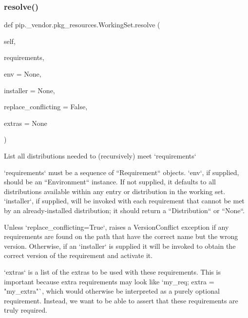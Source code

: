 \subsubsection{\texorpdfstring{resolve()}{resolve()}}
{\footnotesize\ttfamily def pip.\+\_\+vendor.\+pkg\+\_\+resources.\+Working\+Set.\+resolve (\begin{DoxyParamCaption}\item[{}]{self,  }\item[{}]{requirements,  }\item[{}]{env = {\ttfamily None},  }\item[{}]{installer = {\ttfamily None},  }\item[{}]{replace\+\_\+conflicting = {\ttfamily False},  }\item[{}]{extras = {\ttfamily None} }\end{DoxyParamCaption})}

\begin{DoxyVerb}List all distributions needed to (recursively) meet `requirements`

`requirements` must be a sequence of ``Requirement`` objects.  `env`,
if supplied, should be an ``Environment`` instance.  If
not supplied, it defaults to all distributions available within any
entry or distribution in the working set.  `installer`, if supplied,
will be invoked with each requirement that cannot be met by an
already-installed distribution; it should return a ``Distribution`` or
``None``.

Unless `replace_conflicting=True`, raises a VersionConflict exception
if
any requirements are found on the path that have the correct name but
the wrong version.  Otherwise, if an `installer` is supplied it will be
invoked to obtain the correct version of the requirement and activate
it.

`extras` is a list of the extras to be used with these requirements.
This is important because extra requirements may look like `my_req;
extra = "my_extra"`, which would otherwise be interpreted as a purely
optional requirement.  Instead, we want to be able to assert that these
requirements are truly required.
\end{DoxyVerb}
 \mbox{\label{classpip_1_1__vendor_1_1pkg__resources_1_1WorkingSet_a64f8503c4eb0c05db9faf1bc62c1a21f}} 
